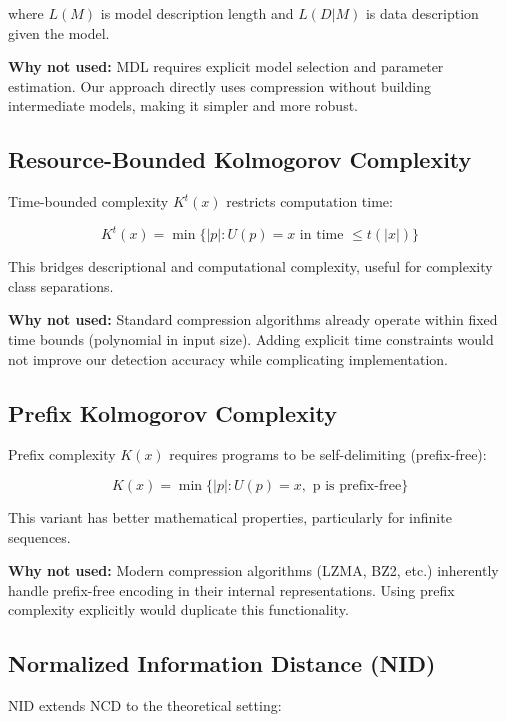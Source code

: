 \documentclass[12pt,a4paper]{report}
\begin{document}
where $L(M)$ is model description length and $L(D|M)$ is data description given the model.

\textbf{Why not used:} MDL requires explicit model selection and parameter estimation. Our approach directly uses compression without building intermediate models, making it simpler and more robust.

\subsection{Resource-Bounded Kolmogorov Complexity}

Time-bounded complexity $K^t(x)$ restricts computation time:

\begin{equation}
K^t(x) = \min\{|p| : U(p) = x \text{ in time } \leq t(|x|)\}
\end{equation}

This bridges descriptional and computational complexity, useful for complexity class separations.

\textbf{Why not used:} Standard compression algorithms already operate within fixed time bounds (polynomial in input size). Adding explicit time constraints would not improve our detection accuracy while complicating implementation.

\subsection{Prefix Kolmogorov Complexity}

Prefix complexity $K(x)$ requires programs to be self-delimiting (prefix-free):

\begin{equation}
K(x) = \min\{|p| : U(p) = x, \text{ p is prefix-free}\}
\end{equation}

This variant has better mathematical properties, particularly for infinite sequences.

\textbf{Why not used:} Modern compression algorithms (LZMA, BZ2, etc.) inherently handle prefix-free encoding in their internal representations. Using prefix complexity explicitly would duplicate this functionality.

\subsection{Normalized Information Distance (NID)}

NID extends NCD to the theoretical setting:
\end{document}
